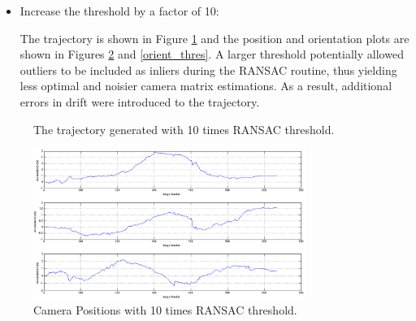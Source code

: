 \documentclass[letter, 10pt]{article}
\begin{document}
\begin{onehalfspacing}
\begin{enumerate}[leftmargin=2em,label={\alph*)}]
\begin{itemize}
\item Increase the threshold by a factor of 10:

The trajectory is shown in Figure \ref{traj_thres} and the position and orientation plots are shown in Figures \ref{pos_thres} and \ref{orient_thres}. A larger threshold potentially allowed outliers to be included as inliers during the RANSAC routine, thus yielding less optimal and noisier camera matrix estimations. As a result, additional errors in drift were introduced to the trajectory.

\end{itemize}

\begin{figure}[h!]
	\centering
	\caption{The trajectory generated with 10 times RANSAC threshold.}
	\label{traj_thres}
\end{figure}
\begin{figure}[h!]
	\centering
	\includegraphics[width=0.79\textwidth]{position_adjusted_thres.png}
	\caption{Camera Positions with 10 times RANSAC threshold.}
	\label{pos_thres}
\end{figure}
\begin{figure}[h!]

\end{figure}
\end{enumerate}
\end{onehalfspacing}
\end{document}
